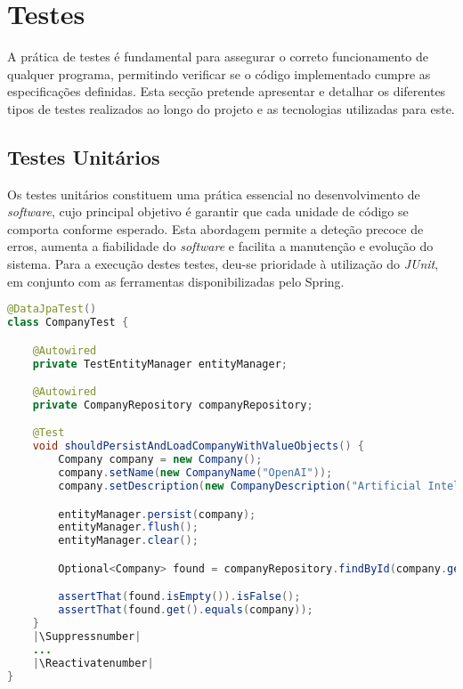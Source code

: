 \section{Testes}

A prática de testes é fundamental para assegurar o correto funcionamento de qualquer programa, permitindo verificar se o código implementado cumpre as especificações definidas. Esta secção pretende apresentar e detalhar os diferentes tipos de testes realizados ao longo do projeto e as tecnologias utilizadas para este.

\subsection{Testes Unitários}

Os testes unitários constituem uma prática essencial no desenvolvimento de \textit{software}, cujo principal objetivo é garantir que cada unidade de código se comporta conforme esperado. Esta abordagem permite a deteção precoce de erros, aumenta a fiabilidade do \textit{software} e facilita a manutenção e evolução do sistema. Para a execução destes testes, deu-se prioridade à utilização do \textit{JUnit}, em conjunto com as ferramentas disponibilizadas pelo \gls{Spring}.

\begin{lstlisting}[language=Java, label={lst:class-CompanyTest}, caption={Class \textit{CompanyTest} - Exemplificação de testes Unitários}]
@DataJpaTest()
class CompanyTest {

    @Autowired
    private TestEntityManager entityManager;

    @Autowired
    private CompanyRepository companyRepository;

    @Test
    void shouldPersistAndLoadCompanyWithValueObjects() {
        Company company = new Company();
        company.setName(new CompanyName("OpenAI"));
        company.setDescription(new CompanyDescription("Artificial Intelligence Research"));

        entityManager.persist(company);
        entityManager.flush();
        entityManager.clear();

        Optional<Company> found = companyRepository.findById(company.getIid());

        assertThat(found.isEmpty()).isFalse();
        assertThat(found.get().equals(company));
    }
    |\Suppressnumber|
    ...
    |\Reactivatenumber|
}
\end{lstlisting}

